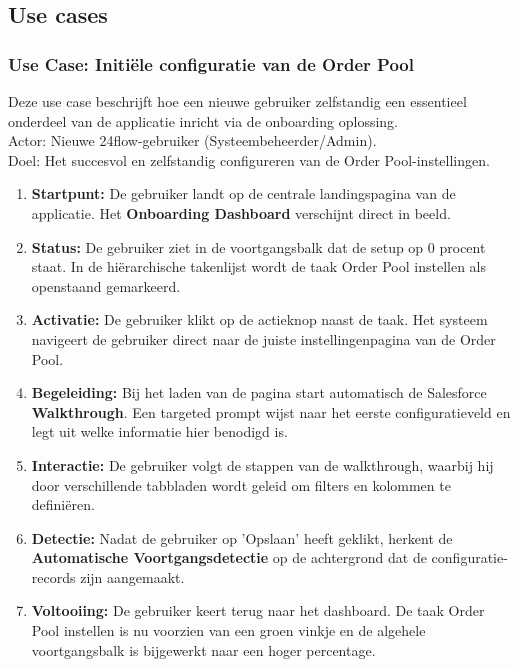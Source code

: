 \subsection{Use cases}

\subsubsection{Use Case: Initiële configuratie van de Order Pool}
Deze use case beschrijft hoe een nieuwe gebruiker zelfstandig een essentieel onderdeel van de applicatie inricht via de onboarding oplossing.
\\

Actor: Nieuwe 24flow-gebruiker (Systeembeheerder/Admin).
\\

Doel: Het succesvol en zelfstandig configureren van de Order Pool-instellingen.

\begin{enumerate}
	\item \textbf{Startpunt:} De gebruiker landt op de centrale landingspagina van de applicatie. Het \textbf{Onboarding Dashboard} verschijnt direct in beeld.
	\item \textbf{Status:} De gebruiker ziet in de voortgangsbalk dat de setup op 0 procent staat. In de hiërarchische takenlijst wordt de taak Order Pool instellen als openstaand gemarkeerd.
	\item \textbf{Activatie:} De gebruiker klikt op de actieknop naast de taak. Het systeem navigeert de gebruiker direct naar de juiste instellingenpagina van de Order Pool.
	\item \textbf{Begeleiding:} Bij het laden van de pagina start automatisch de Salesforce \textbf{Walkthrough}. Een targeted prompt wijst naar het eerste configuratieveld en legt uit welke informatie hier benodigd is.
	\item \textbf{Interactie:} De gebruiker volgt de stappen van de walkthrough, waarbij hij door verschillende tabbladen wordt geleid om filters en kolommen te definiëren.
	\item \textbf{Detectie:} Nadat de gebruiker op 'Opslaan' heeft geklikt, herkent de \textbf{Automatische Voortgangsdetectie} op de achtergrond dat de configuratie-records zijn aangemaakt.
	\item \textbf{Voltooiing:} De gebruiker keert terug naar het dashboard. De taak Order Pool instellen is nu voorzien van een groen vinkje en de algehele voortgangsbalk is bijgewerkt naar een hoger percentage.
\end{enumerate}

